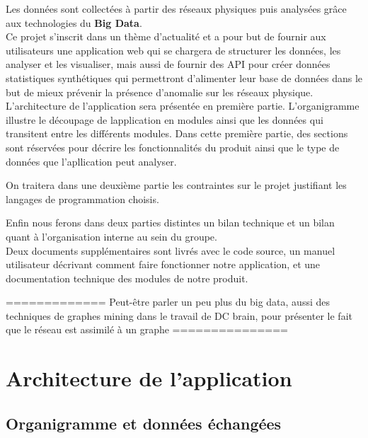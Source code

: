 		Les données sont collectées à partir des réseaux physiques puis analysées grâce aux technologies du \textbf{Big Data}.\\
		
		Ce projet s'inscrit dans un thème d'actualité et a pour but de fournir aux utilisateurs une application web qui se chargera de structurer les données, les analyser et les visualiser, mais aussi de fournir des API pour créer données statistiques synthétiques qui permettront d'alimenter leur base de données dans le but de mieux prévenir la présence d'anomalie sur les réseaux physique.\\
		
		L'architecture de l'application sera présentée en première partie. L'organigramme illustre le découpage de lapplication en modules ainsi que les données qui transitent entre les différents modules. Dans cette première partie, des sections sont réservées pour décrire les fonctionnalités du produit ainsi que le type de données que l'apllication peut analyser.
		
		On traitera dans une deuxième partie les contraintes sur le projet justifiant les langages de programmation choisis.
		
		Enfin nous ferons dans deux parties distintes un bilan technique et un bilan quant à l'organisation interne au sein du groupe.\\
		
		Deux documents supplémentaires sont livrés avec le code source, un manuel utilisateur décrivant comment faire fonctionner notre application, et une documentation technique des modules de notre produit.
		
		
		
		
		============= Peut-être parler un peu plus du big data, aussi des techniques de graphes mining dans le travail de DC brain, pour présenter le fait que le réseau est assimilé à un graphe ===============
	
	\section{Architecture de l'application}
		\subsection{Organigramme et données échangées}
		
